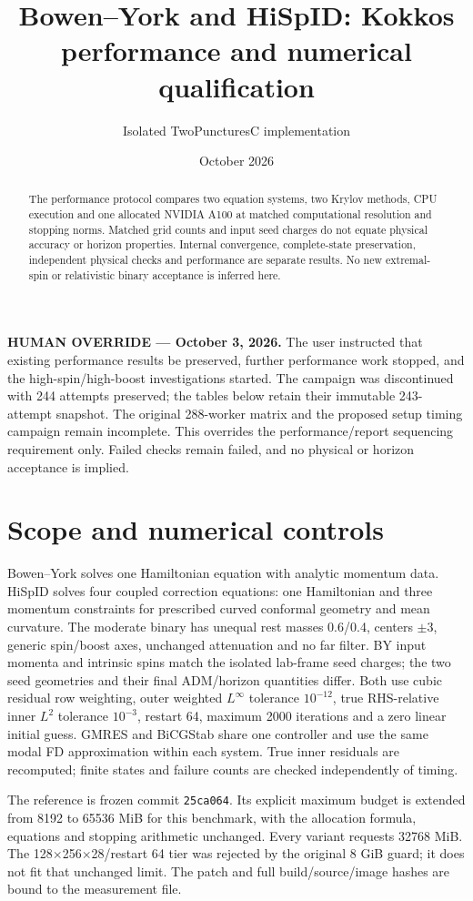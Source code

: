 \documentclass[11pt]{article}
\title{Bowen--York and HiSpID: Kokkos performance and numerical qualification}
\author{Isolated TwoPuncturesC implementation}
\date{October 2026}
\begin{document}
\maketitle
\noindent\textbf{HUMAN OVERRIDE --- October 3, 2026.}
The user instructed that existing performance results be preserved, further
performance work stopped, and the high-spin/high-boost investigations started.
The campaign was discontinued with 244 attempts preserved; the tables below
retain their immutable 243-attempt snapshot. The original 288-worker matrix and
the proposed setup timing campaign remain incomplete. This overrides the
performance/report sequencing requirement only. Failed checks remain failed,
and no physical or horizon acceptance is implied.\par
\begin{abstract}
The performance protocol compares two equation systems, two Krylov methods, CPU execution
and one allocated NVIDIA A100 at matched computational resolution and
stopping norms. Matched grid counts and input seed charges do not equate
physical accuracy or horizon properties. Internal convergence, complete-state
preservation, independent physical checks and performance are separate results.
No new extremal-spin or relativistic binary acceptance is inferred here.
\end{abstract}
\section{Scope and numerical controls}
Bowen--York solves one Hamiltonian equation with analytic momentum data.
HiSpID solves four coupled correction equations: one Hamiltonian and three
momentum constraints for prescribed curved conformal geometry and mean
curvature. The moderate binary has unequal rest masses 0.6/0.4, centers
$\pm3$, generic spin/boost axes, unchanged attenuation and no far filter.
BY input momenta and intrinsic spins match the isolated lab-frame seed
charges; the two seed geometries and their final ADM/horizon quantities differ.
Both use cubic residual row weighting, outer weighted $L^\infty$ tolerance
$10^{-12}$, true RHS-relative inner $L^2$ tolerance $10^{-3}$, restart 64,
maximum 2000 iterations and a zero linear initial guess. GMRES and BiCGStab
share one controller and use the same modal FD approximation within each
system. True inner residuals are recomputed; finite states and failure
counts are checked independently of timing.

The reference is frozen commit \texttt{25ca064}. Its explicit maximum budget
is extended from 8192 to 65536 MiB for this benchmark, with the allocation
formula, equations and stopping arithmetic unchanged. Every variant requests
32768 MiB. The 128$\times$256$\times$28/restart 64 tier was rejected by the
original 8 GiB guard; it does not fit that unchanged limit. The patch and full
build/source/image hashes are bound to the measurement file.
\end{document}
